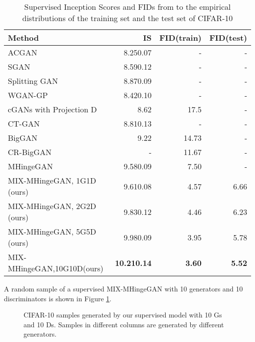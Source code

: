 \documentclass[conference]{IEEEtran}
\begin{document}
\begin{table}[!h]
	\centering
	\begin{tabular}{l|r|r|r}
		Method&IS&FID(train)&FID(test)\\\hline
		ACGAN\cite{ACGAN}&8.250.07&-&-\\
		SGAN \cite{sgan}&8.590.12&-&-\\
		Splitting GAN\cite{class-splitting-gan}&8.870.09&-&-\\
		WGAN-GP\cite{improvedwgan}&8.420.10&-&-\\
		cGANs with Projection D \cite{cgans}&8.62&17.5&-\\
		CT-GAN\cite{improving}&8.810.13&-&-\\
		BigGAN\cite{biggan}&9.22&14.73&-\\	
		CR-BigGAN\cite{cr-biggan}&-&11.67&-\\	
		MHingeGAN\cite{MHGAN}&9.580.09& 7.50&-\\
		MIX-MHingeGAN, 1G1D (ours)&9.610.08&4.57 & 6.66\\
		MIX-MHingeGAN, 2G2D (ours)&9.830.12 &4.46  &6.23 \\
		MIX-MHingeGAN, 5G5D (ours)&9.980.09&3.95&5.78\\
		MIX-MHingeGAN,10G10D(ours)&\bf10.210.14&\bf3.60&\bf5.52\\
	\end{tabular}
	\caption{\label{supervised_table}Supervised Inception Scores and FIDs from  to the empirical distributions of the training set and the test set of CIFAR-10}
\end{table}

A random sample of a supervised MIX-MHingeGAN with 10 generators and 10 discriminators is shown in Figure \ref{supervised}.
\begin{figure}[!h]
	\begin{center}
	\end{center}
	\caption{CIFAR-10 samples generated by our supervised model with 10 Gs and 10 Ds. Samples in different columns are generated by different generators.}
	\label{supervised}
\end{figure}
\end{document}

